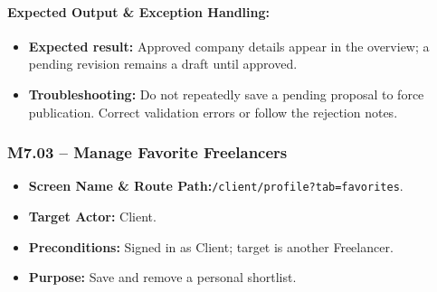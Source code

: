 \paragraph{Expected Output \& Exception Handling:}
\begin{itemize}[leftmargin=1.5em,itemsep=2pt]
  \item \textbf{Expected result:} Approved company details appear in the overview; a pending revision remains a draft until approved.
  \item \textbf{Troubleshooting:} Do not repeatedly save a pending proposal to force publication. Correct validation errors or follow the rejection notes.
\end{itemize}

\newpage
\subsubsection{M7.03 -- Manage Favorite Freelancers}
\begin{itemize}[leftmargin=1.5em,itemsep=2pt]
  \item \textbf{Screen Name \& Route Path:}\newline \texttt{/client/profile?tab=favorites}.
  \item \textbf{Target Actor:} Client.
  \item \textbf{Preconditions:} Signed in as Client; target is another Freelancer.
  \item \textbf{Purpose:} Save and remove a personal shortlist.
\end{itemize}
